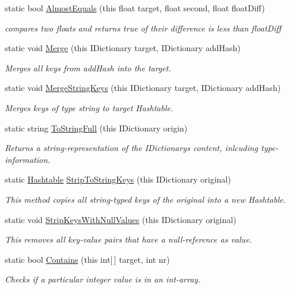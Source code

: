 \begin{DoxyCompactItemize}
static bool \hyperlink{class_extensions_a740813774fff222b8d4a4f23f2fa2326}{Almost\+Equals} (this float target, float second, float float\+Diff)
\begin{DoxyCompactList}\small\item\em compares two floats and returns true of their difference is less than float\+Diff\end{DoxyCompactList}\item 
static void \hyperlink{class_extensions_a6b5d90a1ed678d74548f4ce759b47043}{Merge} (this I\+Dictionary target, I\+Dictionary add\+Hash)
\begin{DoxyCompactList}\small\item\em Merges all keys from add\+Hash into the target. \end{DoxyCompactList}\item 
static void \hyperlink{class_extensions_ac37ceea048b52ed7df7dc2dc3ea49c04}{Merge\+String\+Keys} (this I\+Dictionary target, I\+Dictionary add\+Hash)
\begin{DoxyCompactList}\small\item\em Merges keys of type string to target Hashtable. \end{DoxyCompactList}\item 
static string \hyperlink{class_extensions_a646282c077a078cdaeab9184809c2e76}{To\+String\+Full} (this I\+Dictionary origin)
\begin{DoxyCompactList}\small\item\em Returns a string-\/representation of the I\+Dictionary\textquotesingle{}s content, inlcuding type-\/information. \end{DoxyCompactList}\item 
static \hyperlink{_extensions_8cs_afa613ef589c02dbd94acc273b62cdcfd}{Hashtable} \hyperlink{class_extensions_a59cc48f36f7bf9a0ae0f8efefff91a74}{Strip\+To\+String\+Keys} (this I\+Dictionary original)
\begin{DoxyCompactList}\small\item\em This method copies all string-\/typed keys of the original into a new Hashtable. \end{DoxyCompactList}\item 
static void \hyperlink{class_extensions_a733a7e102e781cf0879e96d535bbd2d8}{Strip\+Keys\+With\+Null\+Values} (this I\+Dictionary original)
\begin{DoxyCompactList}\small\item\em This removes all key-\/value pairs that have a null-\/reference as value. \end{DoxyCompactList}\item 
static bool \hyperlink{class_extensions_ac89906aaca1f1603398873874d981417}{Contains} (this int\mbox{[}$\,$\mbox{]} target, int nr)
\begin{DoxyCompactList}\small\item\em Checks if a particular integer value is in an int-\/array. \end{DoxyCompactList}\end{DoxyCompactItemize}


